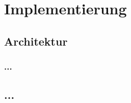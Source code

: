 \chapter{Implementierung}
\label{implementierung}


\section{Architektur}
\label{architektur}


\subsection{...}

\section{...}
